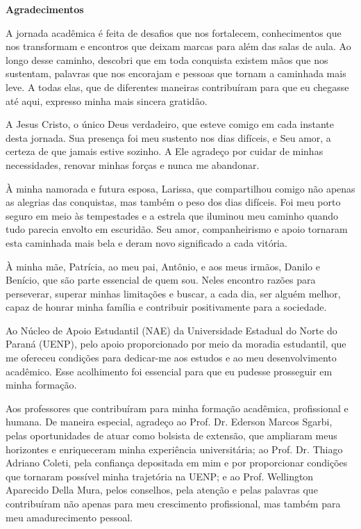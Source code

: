 \thispagestyle{empty}
\hspace{1cm}

\centering\textbf{Agradecimentos}
\begin{flushleft}

{\normalsize\onehalfspacing A jornada acadêmica é feita de desafios que nos fortalecem, conhecimentos que nos transformam e encontros que deixam marcas para além das salas de aula. Ao longo desse caminho, descobri que em toda conquista existem mãos que nos sustentam, palavras que nos encorajam e pessoas que tornam a caminhada mais leve. A todas elas, que de diferentes maneiras contribuíram para que eu chegasse até aqui, expresso minha mais sincera gratidão.

A Jesus Cristo, o único Deus verdadeiro, que esteve comigo em cada instante desta jornada. Sua presença foi meu sustento nos dias difíceis, e Seu amor, a certeza de que jamais estive sozinho. A Ele agradeço por cuidar de minhas necessidades, renovar minhas forças e nunca me abandonar.

À minha namorada e futura esposa, Larissa, que compartilhou comigo não apenas as alegrias das conquistas, mas também o peso dos dias difíceis. Foi meu porto seguro em meio às tempestades e a estrela que iluminou meu caminho quando tudo parecia envolto em escuridão. Seu amor, companheirismo e apoio tornaram esta caminhada mais bela e deram novo significado a cada vitória.

À minha mãe, Patrícia, ao meu pai, Antônio, e aos meus irmãos, Danilo e Benício, que são parte essencial de quem sou. Neles encontro razões para perseverar, superar minhas limitações e buscar, a cada dia, ser alguém melhor, capaz de honrar minha família e contribuir positivamente para a sociedade.

Ao Núcleo de Apoio Estudantil (NAE) da Universidade Estadual do Norte do Paraná (UENP), pelo apoio proporcionado por meio da moradia estudantil, que me ofereceu condições para dedicar-me aos estudos e ao meu desenvolvimento acadêmico. Esse acolhimento foi essencial para que eu pudesse prosseguir em minha formação.

Aos professores que contribuíram para minha formação acadêmica, profissional e humana. De maneira especial, agradeço ao Prof. Dr. Ederson Marcos Sgarbi, pelas oportunidades de atuar como bolsista de extensão, que ampliaram meus horizontes e enriqueceram minha experiência universitária; ao Prof. Dr. Thiago Adriano Coleti, pela confiança depositada em mim e por proporcionar condições que tornaram possível minha trajetória na UENP; e ao Prof. Wellington Aparecido Della Mura, pelos conselhos, pela atenção e pelas palavras que contribuíram não apenas para meu crescimento profissional, mas também para meu amadurecimento pessoal.

}
\end{flushleft}
